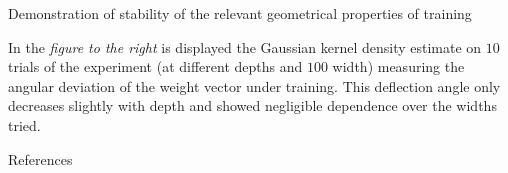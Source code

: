 \documentclass[final,t]{beamer}
\newcommand{\norm}[2][]{#1\lVert #2 #1\rVert}
\newcommand{\A}{\textrm{A}}
\newcommand{\B}{\textrm{B}}
\begin{document}
\begin{frame}[containsverbatim]
\begin{columns}[t]
\begin{column}{.32\linewidth}
\begin{exampleblock}{Demonstration of stability of the relevant geometrical properties of training}
\begin{figure}[htbp]
\begin{subfigure}[b]{.45\textwidth}
  \end{subfigure} 
\end{figure}

In the {\it \color{violet} figure to the right} is displayed the Gaussian kernel density estimate on $10$ trials of the experiment (at different depths and $100$ width) measuring the angular deviation of the weight vector under training. This deflection angle only decreases slightly with depth and showed negligible dependence over the widths tried. 
\vspace{2.2mm}

\end{exampleblock}


\begin{exampleblock}{References}
    \vspace{1mm} 
\printbibliography
\vspace{1mm} 
\end{exampleblock}

\end{column}

\end{columns}
\end{frame}
\end{document}
